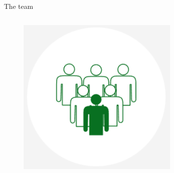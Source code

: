 \documentclass[compress,ignorenonframetext,aspectratio=1610]{beamer}
\begin{document}
\begin{frame}{The team}
\begin{columns}
			\begin{column}{0.2\textwidth}

				\begin{figure}
					\includegraphics[width=0.7\textwidth]{figs/logos/bps.png}
				\end{figure}	
			\end{column}

		\end{columns}
	\end{frame}
\end{document}
